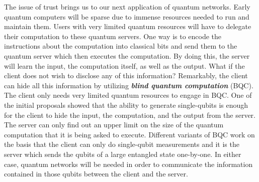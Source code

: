 The issue of trust brings us to our next application of quantum networks.
Early quantum computers will be sparse due to immense resources needed to run and maintain them.
Users with very limited quantum resources will have to delegate their computation to these quantum servers.
One way is to encode the instructions about the computation into classical bits and send them to the quantum server which then executes the computation.
By doing this, the server will learn the input, the computation itself, as well as the output.
What if the client does not wish to disclose any of this information?
Remarkably, the client can hide all this information by utilizing \textbf{\emph{blind quantum computation}} (BQC).
The client only needs very limited quantum resources to engage in BQC.
One of the initial proposals showed that the ability to generate single-qubits is enough for the client to hide the input, the computation, and the output from the server.
The server can only find out an upper limit on the size of the quantum computation that it is being asked to execute.
Different variants of BQC work on the basis that the client can only do single-qubit measurements and it is the server which sends the qubits of a large entangled state one-by-one.
In either case, quantum networks will be needed in order to communicate the information contained in those qubits between the client and the server.




